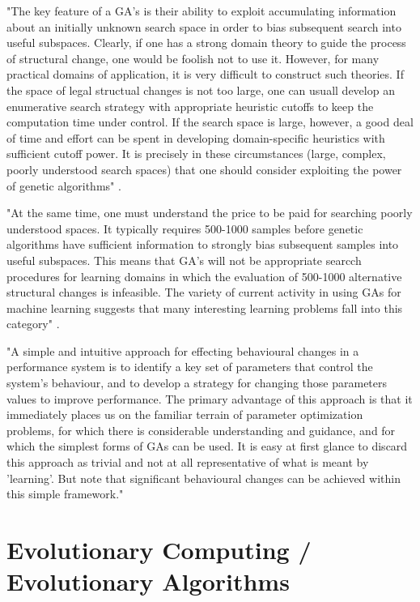 "The key feature of a GA's is their ability to exploit accumulating information about an initially unknown search space in order to bias subsequent search into useful subspaces. Clearly, if one has a strong domain theory to guide the process of structural change, one would be foolish not to use it. However, for many practical domains of application, it is very difficult to construct such theories. If the space of legal structual changes is not too large, one can usuall develop an enumerative search strategy with appropriate heuristic cutoffs to keep the computation time under control. If the search space is large, however, a good deal of time and effort can be spent in developing domain-specific heuristics with sufficient cutoff power. It is precisely in these circumstances (large, complex, poorly understood search spaces) that one should consider exploiting the power of genetic algorithms" \cite{de1988learning}.

"At the same time, one must understand the price to be paid for searching poorly understood spaces. It typically requires 500-1000 samples before genetic algorithms have sufficient information to strongly bias subsequent samples into useful subspaces. This means that GA's will not be appropriate searcch procedures for learning domains in which the evaluation of 500-1000 alternative structural changes is infeasible. The variety of current activity in using GAs for machine learning suggests that many interesting learning problems fall into this category" \cite{de1988learning}.

"A simple and intuitive approach for effecting behavioural changes in a performance system is to identify a key set of parameters that control the system's behaviour, and to develop a strategy for changing those parameters values to improve performance. The primary advantage of this approach is that it immediately places us on the familiar terrain of parameter optimization problems, for which there is considerable understanding and guidance, and for which the simplest forms of GAs can be used. It is easy at first glance to discard this approach as trivial and not at all representative of what is meant by 'learning'. But note that significant behavioural changes can be achieved within this simple framework."

\section{Evolutionary Computing / Evolutionary Algorithms}


